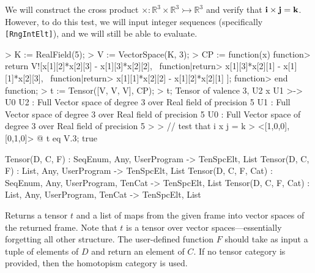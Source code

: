 \begin{example}[BBCrossProduct]

We will construct the cross product $\times : \mathbb{R}^3\times
\mathbb{R}^3\rightarrowtail \mathbb{R}^3$ and verify that ${\bf i}\times {\bf j}
= {\bf k}$. However, to do this test, we will input integer sequences
(specifically \texttt{[RngIntElt]}), and we will still be able to evaluate.
\begin{code}
> K := RealField(5);
> V := VectorSpace(K, 3);
> CP := function(x)
function>   return V![x[1][2]*x[2][3] - x[1][3]*x[2][2], \
function|return>     x[1][3]*x[2][1] - x[1][1]*x[2][3], \
function|return>     x[1][1]*x[2][2] - x[1][2]*x[2][1] ];
function> end function;
> t := Tensor([V, V, V], CP);
> t;
Tensor of valence 3, U2 x U1 >-> U0
U2 : Full Vector space of degree 3 over Real field of precision 5
U1 : Full Vector space of degree 3 over Real field of precision 5
U0 : Full Vector space of degree 3 over Real field of precision 5
> 
> // test that i x j = k
> <[1,0,0], [0,1,0]> @ t eq V.3;
true
\end{code}
\end{example}

\begin{intrinsics}
Tensor(D, C, F) : SeqEnum, Any, UserProgram -> TenSpcElt, List
Tensor(D, C, F) : List, Any, UserProgram -> TenSpcElt, List
Tensor(D, C, F, Cat) : SeqEnum, Any, UserProgram, TenCat -> TenSpcElt, List
Tensor(D, C, F, Cat) : List, Any, UserProgram, TenCat -> TenSpcElt, List
\end{intrinsics}

Returns a tensor $t$ and a list of maps from the given frame into vector spaces
of the returned frame. Note that $t$ is a tensor over vector
spaces---essentially forgetting all other structure. The user-defined function
$F$ should take as input a tuple of elements of $D$ and return an element of
$C$. If no tensor category is provided, then the homotopism category is used.

